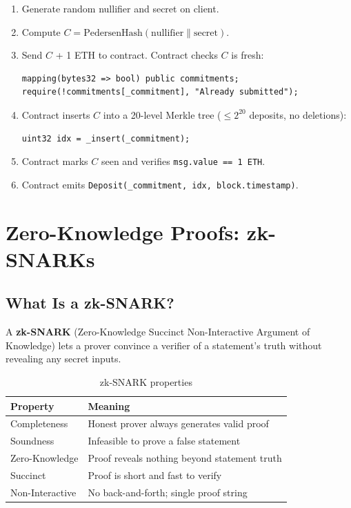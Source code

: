 \documentclass[12pt,a4paper,openany]{book}
\theoremstyle{definition}
\theoremstyle{plain}
\theoremstyle{remark}
\begin{document}
\begin{enumerate}
  \item Generate random nullifier and secret on client.
  \item Compute $C = \mathrm{PedersenHash}(\text{nullifier}\|\text{secret})$.
  \item Send $C$ + 1 ETH to contract.  Contract checks $C$ is fresh:
\begin{lstlisting}[language=Solidity]
mapping(bytes32 => bool) public commitments;
require(!commitments[_commitment], "Already submitted");
\end{lstlisting}
  \item Contract inserts $C$ into a 20-level Merkle tree
        ($\leq 2^{20}$ deposits, no deletions):
\begin{lstlisting}[language=Solidity]
uint32 idx = _insert(_commitment);
\end{lstlisting}
  \item Contract marks $C$ seen and verifies \texttt{msg.value == 1 ETH}.
  \item Contract emits \texttt{Deposit(\_commitment, idx, block.timestamp)}.
\end{enumerate}

\section{Zero-Knowledge Proofs: zk-SNARKs}

\subsection{What Is a zk-SNARK?}

A \textbf{zk-SNARK} (Zero-Knowledge Succinct Non-Interactive Argument
of Knowledge) lets a prover convince a verifier of a statement's truth
without revealing any secret inputs.

\begin{table}[h]
\centering
\caption{zk-SNARK properties}
\begin{tabular}{ll}
\toprule
\textbf{Property} & \textbf{Meaning} \\
\midrule
Completeness    & Honest prover always generates valid proof \\
Soundness       & Infeasible to prove a false statement \\
Zero-Knowledge  & Proof reveals nothing beyond statement truth \\
Succinct        & Proof is short and fast to verify \\
Non-Interactive & No back-and-forth; single proof string \\
\bottomrule
\end{tabular}
\end{table}
\end{document}
